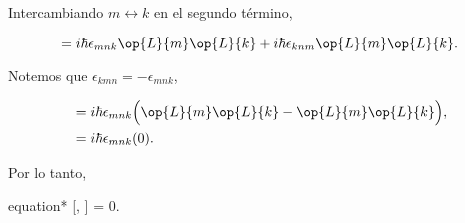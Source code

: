 \documentclass[../main.tex]{subfiles}
\begin{document}
\begin{problema}
	Intercambiando \(m \leftrightarrow k\) en el segundo término,

	\begin{equation*}
		[\op{L}{}{2}, \op{L}{n}] = i\hbar\epsilon_{mnk}\op{L}{m}\op{L}{k} +
		i\hbar\epsilon_{knm}\op{L}{m}\op{L}{k}.
	\end{equation*}

	Notemos que \(\epsilon_{kmn} = -\epsilon_{mnk}\),

	\begin{align*}
		[\op{L}{}{2}, \op{L}{n}] & = i\hbar\epsilon_{mnk}\Bigl(\op{L}{m}\op{L}{k} - \op{L}{m}\op{L}{k}\Bigr), \\
		                         & = i\hbar\epsilon_{mnk}(0).
	\end{align*}

	Por lo tanto,

	\begin{empheq}[box = \mainresult]{equation*}
		[, ] = 0.
	\end{empheq}
\end{problema}
\end{document}

